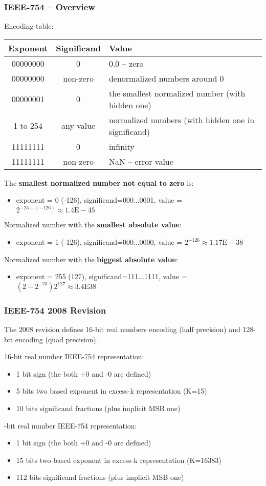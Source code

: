 \documentclass{beamer}
\begin{document}
\begin{frame}[shrink=5]
\frametitle{IEEE-754 -- Overview}

Encoding table:
\begin{tabular}{|c|c|l|}\hline
Exponent & Significand &  Value \\ \hline
00000000 & 0 &  0.0 -- zero \\ \hline
00000000 & non-zero &  denormalized numbers around 0 \\ \hline
00000001 & 0 & the smallest normalized number (with hidden one) \\ \hline
\small 1 to 254 & any value &  normalized numbers (with hidden one in significand)  \\ \hline
11111111 & 0 &  infinity \\ \hline
11111111 & non-zero &  NaN -- error value \\ \hline
\end{tabular}
\bigskip

The \textbf{smallest normalized number not equal to zero} is:
\begin{itemize}
\item \small exponent = 0 (-126), significand=000...0001, value = $2^{-23+(-126)} \approx 1.4\text{E}-45$
\end{itemize}
Normalized number with the \textbf{smallest absolute value}:
\begin{itemize}
\item \small exponent = 1 (-126), significand=000...0000, value = $2^{-126} \approx 1.17\text{E}-38$
\end{itemize}
Normalized number with the \textbf{biggest absolute value}:
\begin{itemize}
\item \small exponent = 255 (127), significand=111...1111, value = $(2-2^{-23})2^{127} \approx 3.4\text{E}38$
\end{itemize}
\end{frame}


\begin{frame}
\frametitle{IEEE-754 2008 Revision }

The 2008 revision defines 16-bit real numbers encoding (half precision) and 128-bit encoding (quad precision).

16-bit real number IEEE-754 representation:
\begin{itemize}
\item 1 bit sign (the both +0 and -0 are defined)
\item 5 bits two based exponent in excess-k representation (K=15)
\item 10 bits significand fractions (plus implicit MSB one)
\end{itemize}
-bit real number IEEE-754 representation:
\begin{itemize}
\item 1 bit sign (the both +0 and -0 are defined)
\item 15 bits two based exponent in excess-k representation (K=16383)
\item 112 bits significand fractions (plus implicit MSB one)
\end{itemize}

\end{frame}
\end{document}
